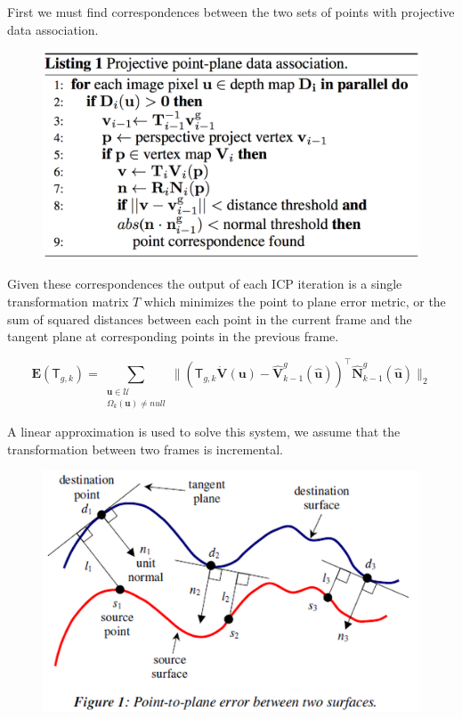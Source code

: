 \documentclass[10pt,twocolumn]{article}
\begin{document}
First we must find correspondences between the two sets of points with projective data association. 
\begin{figure}
\includegraphics[width=0.8\linewidth]{icp}
\end{figure}


Given these correspondences the output of each ICP iteration is a single transformation matrix $T$ which minimizes the point to plane error metric, or the sum of squared distances between each point in the current frame and the tangent plane at corresponding points in the previous frame.

$$
\mathbf{E}(\mathsf{T}_{g,k}) = 
\sum_{\substack{
   \mathbf{u} \in \mathcal{U} \\
   \Omega_{k}(\mathbf{u}) \neq null
  }}
  \| ( \mathsf{T}_{g,k} \mathbf{\dot{V}} (\mathbf{u}) - \mathbf{\hat{V}}^{g}_{k-1} (\mathbf{\hat{u}}))^{\top} \mathbf{\hat{N}}^{g}_{k-1} (\mathbf{\hat{u}}) \|_{2}
$$

A linear approximation is used to solve this system, we assume that the transformation between two frames is incremental.

\begin{figure}
\includegraphics[width=0.8\linewidth]{pointplane}
\end{figure}
\end{document}
